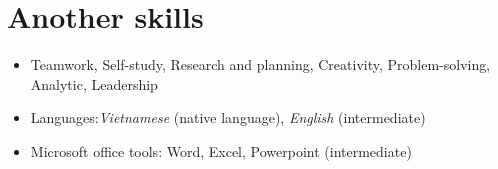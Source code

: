 \documentclass[11pt,a4paper,sans]{moderncv}        %
\begin{document}
\vspace{-2pt}
\section{Another skills}

\begin{itemize}
\item Teamwork, Self-study, Research and planning, Creativity, Problem-solving, Analytic, Leadership
\vspace{1pt}
\item Languages:\textit{Vietnamese} (native language), \textit{English} (intermediate)
\vspace{1pt}
\item Microsoft office tools: Word, Excel, Powerpoint (intermediate)
\vspace{1pt}
\end{itemize}








\end{document}
